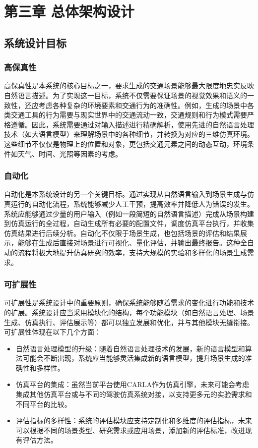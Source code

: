 \chapter{第三章 总体架构设计}
\section{系统设计目标}
\subsection{高保真性}
高保真性是本系统的核心目标之一，要求生成的交通场景能够最大限度地忠实反映自然语言描述。为了实现这一目标，系统不仅需要保证场景的视觉效果和语义的一致性，还应考虑各种复杂的环境要素和交通行为的准确性。例如，生成的场景中各类交通工具的行为需要与现实世界中的交通流动一致，交通规则和行为模式需要严格遵循。因此，系统需要通过对输入描述进行精确解析，使用先进的自然语言处理技术（如大语言模型）来理解场景中的各种细节，并转换为对应的三维仿真环境。这些细节不仅仅是物理上的位置和对象，更包括交通元素之间的动态互动，环境条件如天气、时间、光照等因素的考虑。

\subsection{自动化}
自动化是本系统设计的另一个关键目标。通过实现从自然语言输入到场景生成与仿真运行的自动化流程，系统能够减少人工干预，提高效率并降低人为错误的发生。系统应能够通过少量的用户输入（例如一段简短的自然语言描述）完成从场景构建到仿真运行的全过程，自动生成所有必要的配置文件，调度仿真平台执行，并收集仿真结果进行后续分析。自动化不仅限于场景生成，也包括场景的评估和结果展示，能够在生成后直接对场景进行可视化、量化评估，并输出最终报告。这种全自动的流程将极大地提升仿真研究的效率，支持大规模的实验和多样化的场景生成需求。

\subsection{可扩展性}
可扩展性是系统设计中的重要原则，确保系统能够随着需求的变化进行功能和技术的扩展。系统设计应当采用模块化的结构，每个功能模块（如自然语言处理、场景生成、仿真执行、评估展示等）都可以独立发展和优化，并与其他模块无缝衔接。可扩展性体现在以下几个方面：
\begin{itemize}
	\item 自然语言处理模型的升级：随着自然语言处理技术的发展，新的语言模型和算法可能会不断出现，系统应当能够灵活集成新的语言模型，提升场景生成的准确性和多样性。
	\item 仿真平台的集成：虽然当前平台使用CARLA作为仿真引擎，未来可能会考虑集成其他仿真平台或与不同的驾驶仿真系统对接，以支持更多元的实验需求和不同平台的比较。
	\item 评估指标的多样性：系统的评估模块应支持定制化和多维度的评估指标，未来可以根据不同的场景类型、研究需求或应用场景，添加新的评估标准，改进现有评估方法。
\end{itemize}

